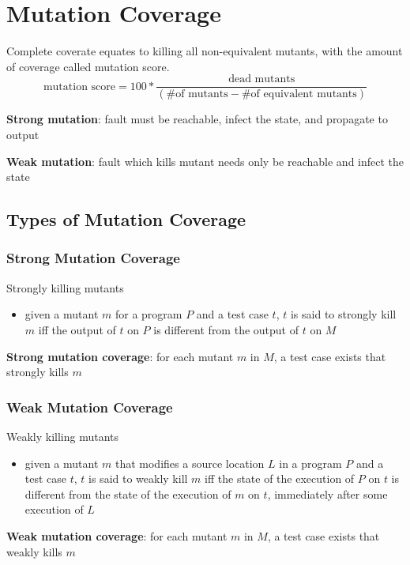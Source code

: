 \documentclass[11pt]{article}
\begin{document}
\section{Mutation Coverage}
\label{sec:orgdb0e7fe}
Complete coverate equates to killing all non-equivalent
mutants, with the amount of coverage called mutation score.
$$
        \text{mutation score} = 100 * \frac{\text{dead mutants}}
        {(\text{\# of mutants} - \text{\# of equivalent mutants})}
$$

\textbf{Strong mutation}: fault must be reachable, infect the state,
and propagate to output

\textbf{Weak mutation}: fault which kills mutant needs only be reachable
and infect the state
\subsection{Types of Mutation Coverage}
\label{sec:org655d26c}
\subsubsection{Strong Mutation Coverage}
\label{sec:org1ce966b}
Strongly killing mutants
\begin{itemize}
\item given a mutant \(m\) for a program \(P\) and a test case \(t\),
\(t\) is said to strongly kill \(m\) iff the output of \(t\)
on \(P\) is different from the output of \(t\) on \(M\)
\end{itemize}

\textbf{Strong mutation coverage}: for each mutant \(m\) in \(M\),
a test case exists that strongly kills \(m\)
\subsubsection{Weak Mutation Coverage}
\label{sec:org3f92ed1}
Weakly killing mutants
\begin{itemize}
\item given a mutant \(m\) that modifies a source location \(L\)
in a program \(P\) and a test case \(t\),
\(t\) is said to weakly kill \(m\) iff the state of the
execution of \(P\) on \(t\) is different from the
state of the execution of \(m\) on \(t\),
immediately after some execution of \(L\)
\end{itemize}

\textbf{Weak mutation coverage}: for each mutant \(m\) in \(M\),
a test case exists that weakly kills \(m\)
\end{document}

